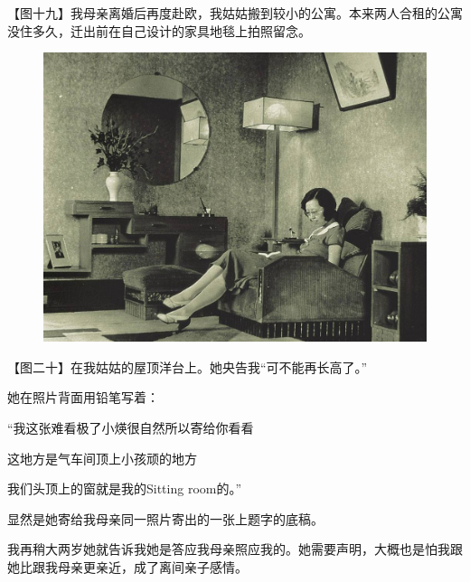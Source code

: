 \clearpage
\par 【图十九】我母亲离婚后再度赴欧，我姑姑搬到较小的公寓。本来两人合租的公寓没住多久，迁出前在自己设计的家具地毯上拍照留念。
\begin{figure}[htb]
    \centering %
    \includegraphics[scale=0.4]{picture/对照记19.jpeg}
\end{figure}

\clearpage
\par 【图二十】在我姑姑的屋顶洋台上。她央告我“可不能再长高了。”
\par 她在照片背面用铅笔写着：
\par “我这张难看极了小煐很自然所以寄给你看看
\par 这地方是气车间顶上小孩顽的地方
\par 我们头顶上的窗就是我的Sitting room的。”
\par 显然是她寄给我母亲同一照片寄出的一张上题字的底稿。
\par 我再稍大两岁她就告诉我她是答应我母亲照应我的。她需要声明，大概也是怕我跟她比跟我母亲更亲近，成了离间亲子感情。


